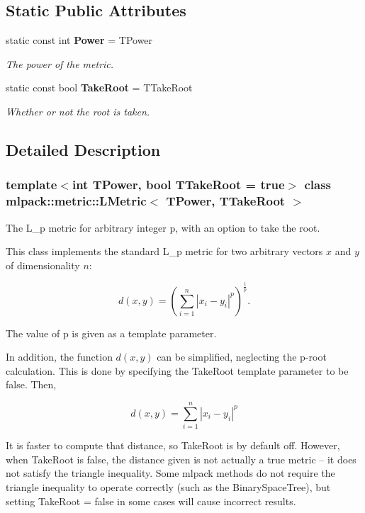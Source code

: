 \subsection*{Static Public Attributes}
\begin{DoxyCompactItemize}
\item 
static const int \textbf{ Power} = T\+Power
\begin{DoxyCompactList}\small\item\em The power of the metric. \end{DoxyCompactList}\item 
static const bool \textbf{ Take\+Root} = T\+Take\+Root
\begin{DoxyCompactList}\small\item\em Whether or not the root is taken. \end{DoxyCompactList}\end{DoxyCompactItemize}


\subsection{Detailed Description}
\subsubsection*{template$<$int T\+Power, bool T\+Take\+Root = true$>$\newline
class mlpack\+::metric\+::\+L\+Metric$<$ T\+Power, T\+Take\+Root $>$}

The L\+\_\+p metric for arbitrary integer p, with an option to take the root. 

This class implements the standard L\+\_\+p metric for two arbitrary vectors $ x $ and $ y $ of dimensionality $ n $\+:

\[ d(x, y) = \left( \sum_{i = 1}^{n} | x_i - y_i |^p \right)^{\frac{1}{p}}. \]

The value of p is given as a template parameter.

In addition, the function $ d(x, y) $ can be simplified, neglecting the p-\/root calculation. This is done by specifying the Take\+Root template parameter to be false. Then,

\[ d(x, y) = \sum_{i = 1}^{n} | x_i - y_i |^p \]

It is faster to compute that distance, so Take\+Root is by default off. However, when Take\+Root is false, the distance given is not actually a true metric -- it does not satisfy the triangle inequality. Some mlpack methods do not require the triangle inequality to operate correctly (such as the Binary\+Space\+Tree), but setting Take\+Root = false in some cases will cause incorrect results.


